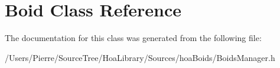 \hypertarget{class_boid}{\section{Boid Class Reference}
\label{class_boid}
}


The documentation for this class was generated from the following file\-:\begin{DoxyCompactItemize}
\item 
/\-Users/\-Pierre/\-Source\-Tree/\-Hoa\-Library/\-Sources/hoa\-Boids/Boids\-Manager.\-h\end{DoxyCompactItemize}
